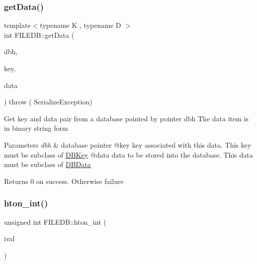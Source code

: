 \subsubsection{\texorpdfstring{getData()}{getData()}\hspace{0.1cm}{\footnotesize\ttfamily [2/2]}}
{\footnotesize\ttfamily template$<$typename K , typename D $>$ \\
int F\+I\+L\+E\+D\+B\+::get\+Data (\begin{DoxyParamCaption}\item[{\mbox{\hyperlink{other__libs_2filedb_2filehash_2ffdb__db_8h_a0b27b956926453a7a8141ea8e10f0df8}{F\+F\+D\+B\+\_\+\+DB}} $\ast$}]{dbh,  }\item[{const K \&}]{key,  }\item[{std\+::string \&}]{data }\end{DoxyParamCaption}) throw ( Serialize\+Exception) }

Get key and data pair from a database pointed by pointer dbh The data item is in binary string form


\begin{DoxyParams}{Parameters}
{\em dbh} & database pointer @key key associated with this data. This key must be subclass of \mbox{\hyperlink{classFILEDB_1_1DBKey}{D\+B\+Key}} @data data to be stored into the database. This data must be subclass of \mbox{\hyperlink{classFILEDB_1_1DBData}{D\+B\+Data}}\\
\hline
\end{DoxyParams}
\begin{DoxyReturn}{Returns}
0 on success. Otherwise failure 
\end{DoxyReturn}
\mbox{\label{namespaceFILEDB_adbce406e3e06947d7312a6d461bc5cc5}} 
\subsubsection{\texorpdfstring{hton\_int()}{hton\_int()}}
{\footnotesize\ttfamily unsigned int F\+I\+L\+E\+D\+B\+::hton\+\_\+int (\begin{DoxyParamCaption}\item[{unsigned int}]{ival }\end{DoxyParamCaption})}

